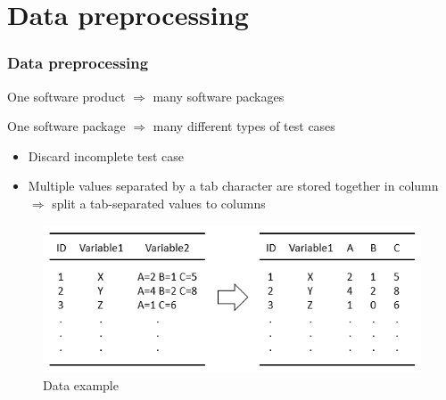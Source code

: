 \documentclass{beamer}
\begin{document}
\section{Data preprocessing}
\begin{frame}
\frametitle{Data preprocessing}
One software product $\Rightarrow$ many software packages

One software package $\Rightarrow$ many different types of test cases

\begin{itemize}
	\item Discard incomplete test case 
	\item Multiple values separated by a tab character are stored together in column $\Rightarrow$ split a tab-separated values to columns
\end{itemize}

\begin{figure}
	\includegraphics[width=0.6\linewidth]{table4}
	\caption{Data example}
\end{figure}

\end{frame}


\end{document}
